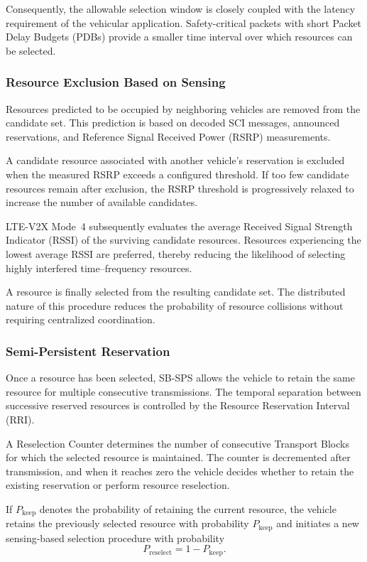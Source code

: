 Consequently, the allowable selection window is closely coupled with the
latency requirement of the vehicular application. Safety-critical packets
with short Packet Delay Budgets (PDBs) provide a smaller time interval over
which resources can be selected.

\subsubsection{Resource Exclusion Based on Sensing}

Resources predicted to be occupied by neighboring vehicles are removed
from the candidate set. This prediction is based on decoded SCI messages,
announced reservations, and Reference Signal Received Power (RSRP)
measurements.

A candidate resource associated with another vehicle's reservation is
excluded when the measured RSRP exceeds a configured threshold. If too few
candidate resources remain after exclusion, the RSRP threshold is
progressively relaxed to increase the number of available candidates.

LTE-V2X Mode~4 subsequently evaluates the average Received Signal Strength
Indicator (RSSI) of the surviving candidate resources. Resources
experiencing the lowest average RSSI are preferred, thereby reducing the
likelihood of selecting highly interfered time--frequency resources.

A resource is finally selected from the resulting candidate set. The
distributed nature of this procedure reduces the probability of resource
collisions without requiring centralized coordination.

\subsubsection{Semi-Persistent Reservation}

Once a resource has been selected, SB-SPS allows the vehicle to retain the
same resource for multiple consecutive transmissions. The temporal
separation between successive reserved resources is controlled by the
Resource Reservation Interval (RRI).

A Reselection Counter determines the number of consecutive Transport Blocks
for which the selected resource is maintained. The counter is decremented
after transmission, and when it reaches zero the vehicle decides whether to
retain the existing reservation or perform resource reselection.

If $P_{\mathrm{keep}}$ denotes the probability of retaining the current
resource, the vehicle retains the previously selected resource with
probability $P_{\mathrm{keep}}$ and initiates a new sensing-based selection
procedure with probability
\begin{equation}
    P_{\mathrm{reselect}}
    =
    1-P_{\mathrm{keep}}.
\end{equation}

